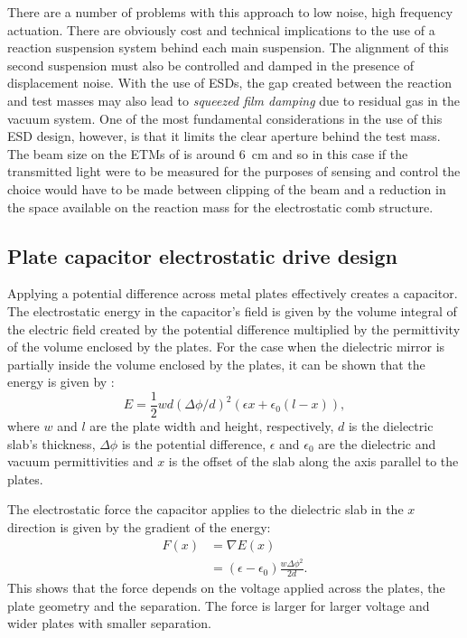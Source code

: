 There are a number of problems with this approach to low noise, high frequency actuation. There are obviously cost and technical implications to the use of a reaction suspension system behind each main suspension. The alignment of this second suspension must also be controlled and damped in the presence of displacement noise. With the use of \glspl{ESD}, the gap created between the reaction and test masses may also lead to \emph{squeezed film damping} due to residual gas in the vacuum system. One of the most fundamental considerations in the use of this \gls{ESD} design, however, is that it limits the clear aperture behind the test mass. The beam size on the \glspl{ETM} of \ALIGO{} is around \SI{6}{\centi\meter} and so in this case if the transmitted light were to be measured for the purposes of sensing and control the choice would have to be made between clipping of the beam and a reduction in the space available on the reaction mass for the electrostatic comb structure.

\subsection{Plate capacitor electrostatic drive design}
Applying a potential difference across metal plates effectively creates a capacitor. The electrostatic energy in the capacitor's field is given by the volume integral of the electric field created by the potential difference multiplied by the permittivity of the volume enclosed by the plates. For the case when the dielectric mirror is partially inside the volume enclosed by the plates, it can be shown that the energy is given by \cite{Margulies1984}:
\begin{equation}
  E = \frac{1}{2} w d \left( \Delta \phi / d \right)^2 \left( \epsilon x + \epsilon_0 \left( l - x \right) \right),
\end{equation}
where $w$ and $l$ are the plate width and height, respectively, $d$ is the dielectric slab's thickness, $\Delta \phi$ is the potential difference, $\epsilon$ and $\epsilon_0$ are the dielectric and vacuum permittivities and $x$ is the offset of the slab along the axis parallel to the plates.

The electrostatic force the capacitor applies to the dielectric slab in the $x$ direction is given by the gradient of the energy:
\begin{equation}
  \label{eq:esd-force}
  \begin{split}
    F \left( x \right) &= \nabla E \left( x \right) \\
                       &= \left( \epsilon - \epsilon_0 \right) \frac{w \Delta \phi^2}{2 d}.
  \end{split}
\end{equation}
This shows that the force depends on the voltage applied across the plates, the plate geometry and the separation. The force is larger for larger voltage and wider plates with smaller separation.

